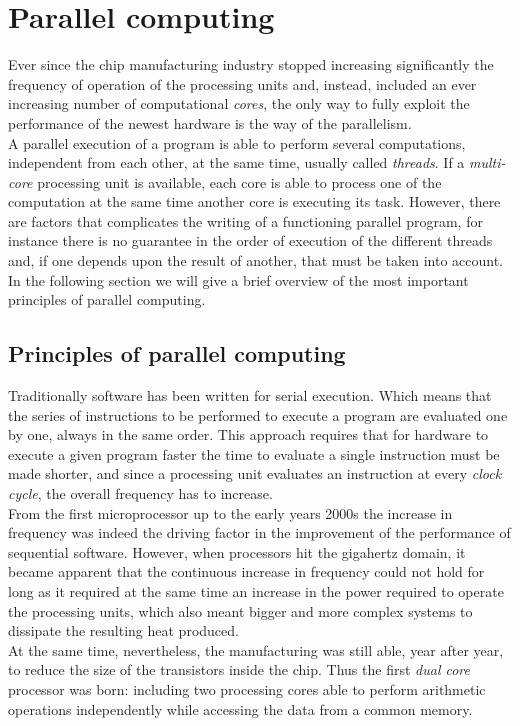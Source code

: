 \chapter{Parallel computing}\label{ch:gpu}
Ever since the chip manufacturing industry stopped increasing significantly the frequency of operation of the processing units and, instead, included an ever increasing number of computational \textit{cores}, the only way to fully exploit the performance of the newest hardware is the way of the parallelism.\\
A parallel execution of a program is able to perform several computations, independent from each other, at the same time, usually called \textit{threads}. If a \textit{multi-core} processing unit is available, each core is able to process one of the computation at the same time another core is executing its task. However, there are factors that complicates the writing of a functioning parallel program, for instance there is no guarantee in the order of execution of the different threads and, if one depends upon the result of another, that must be taken into account.\\
In the following section we will give a brief overview of the most important principles of parallel computing.

\section{Principles of parallel computing}
Traditionally software has been written for serial execution. Which means that the series of instructions to be performed to execute a program are evaluated one by one, always in the same order. This approach requires that for hardware to execute a given program faster the time to evaluate a single instruction must be made shorter, and since a processing unit evaluates an instruction at every \textit{clock cycle}, the overall frequency has to increase.\\
From the first microprocessor up to the early years 2000s the increase in frequency was indeed the driving factor in the improvement of the performance of sequential software. However, when processors hit the gigahertz domain, it became apparent that the continuous increase in frequency could not hold for long as it required at the same time an increase in the power required to operate the processing units, which also meant bigger and more complex systems to dissipate the resulting heat produced.\\
At the same time, nevertheless, the manufacturing was still able, year after year, to reduce the size of the transistors inside the chip. Thus the first \textit{dual core} processor was born: including two processing cores able to perform arithmetic operations independently while accessing the data from a common memory.\\

